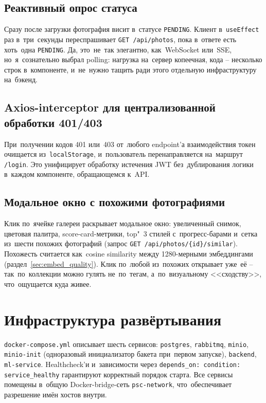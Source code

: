 \documentclass[a4paper,12pt]{diplom}
\begin{document}
\subsection{Реактивный опрос статуса}

Сразу после загрузки фотография висит в~статусе \texttt{PENDING}. Клиент в~\verb|useEffect| раз в~три~секунды переспрашивает \verb|GET /api/photos|, пока в~ответе есть хоть~одна \texttt{PENDING}. Да, это~не~так элегантно, как~WebSocket или~SSE, но~я~сознательно выбрал polling: нагрузка на~сервер копеечная, кода -- несколько строк в~компоненте, и~не~нужно тащить ради этого отдельную инфраструктуру на~бэкенд.

\subsection{Axios-interceptor для централизованной обработки 401/403}

При~получении кодов 401 или~403 от~любого endpoint'а взаимодействия токен очищается из~\verb|localStorage|, и~пользователь перенаправляется на~маршрут \verb|/login|. Это унифицирует обработку истечения JWT без~дублирования логики в~каждом компоненте, обращающемся к~API.

\subsection{Модальное окно с похожими фотографиями}

Клик по~ячейке галереи раскрывает модальное окно: увеличенный снимок, цветовая палитра, score-card-метрики, top"~3 стилей с~прогресс-барами и~сетка из~шести похожих фотографий (запрос \verb|GET /api/photos/{id}/similar|). Похожесть считается как~cosine similarity между 1280-мерными эмбеддингами (раздел~\ref{sec:embed_quality}). Клик по~любой из~похожих открывает уже~её -- так~по~коллекции можно гулять не~по~тегам, а~по~визуальному <<сходству>>, что~ощущается куда живее.

\section{Инфраструктура развёртывания}
\label{sec:infrastructure}

\verb|docker-compose.yml| описывает шесть сервисов: \texttt{postgres}, \texttt{rabbitmq}, \texttt{minio}, \texttt{minio-init} (одноразовый инициализатор бакета при~первом запуске), \texttt{backend}, \texttt{ml-service}. Healthcheck'и и~зависимости через \verb|depends_on: condition: service_healthy| гарантируют корректный порядок старта. Все сервисы помещены в~общую Docker-bridge-сеть \texttt{psc-network}, что~обеспечивает разрешение имён хостов внутри.
\end{document}

